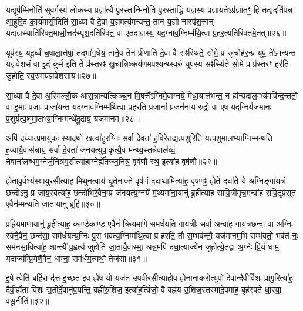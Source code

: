 यद्यूप॑म्मि॒नोति॑ सुव॒र्गस्य॑ लो॒कस्य॒ प्रज्ञा᳚त्यै पु॒रस्ता᳚न्मिनोति पु॒रस्ता॒द्धि य॒ज्ञस्य॑ प्रज्ञा॒यते\-ऽप्र॑ज्ञात॒ꣳ॒ हि तद्यदति॑पन्न आ॒हुरि॒दं का॒र्य॑मासी॒दिति॑ सा॒ध्या वै दे॒वा य॒ज्ञमत्य॑मन्यन्त॒ तान् य॒ज्ञो नास्पृ॑श॒त्तान् यद्य॒ज्ञस्याति॑रिक्त॒मासी॒त्तद॑स्पृश॒\-दति॑रिक्तं॒ वा ए॒तद्य॒ज्ञस्य॒ यद॒ग्नाव॒ग्निम्म॑थि॒त्वा प्र॒हर॒त्यति॑रिक्तमे॒तत्॥२६॥

यूप॑स्य॒ यदू॒र्ध्वं च॒षाला॒त्तेषां॒ तद्भा॑ग॒धेयं॒ ताने॒व तेन॑ प्रीणाति दे॒वा वै सꣴस्थि॑ते॒ सोमे॒ प्र स्रुचोह॑र॒न्प्र यूपं॒ ते॑\-ऽमन्यन्त यज्ञवेश॒सं वा इ॒दं कु॑र्म॒ इति॒ ते प्र॑स्त॒रꣴ स्रु॒चान्नि॒ष्क्रय॑णमपश्य॒न्थ्स्वरुं॒ यूप॑स्य॒ सꣴस्थि॑ते॒ सोमे॒ प्र प्र॑स्त॒रꣳ हर॑ति जु॒होति॒ स्व॒रुमय॑ज्ञवेशसाय॥२७॥

{}

सा॒ध्या वै दे॒वा अ॒स्मिल्लोँ॒क आ॑स॒न्नान्यत्किञ्च॒न मि॒षत्ते᳚\-ऽग्निमे॒वाग्नये॒ मेधा॒याल॑भन्त॒ न ह्य॑न्यदा॑ल॒म्भ्य॑मवि॑न्द॒न्ततो॒ वा इ॒माः प्र॒जाः प्राजा॑यन्त॒ यद॒ग्नाव॒ग्निम्म॑थि॒त्वा प्र॒हर॑ति प्र॒जानां᳚ प्र॒जन॑नाय रु॒द्रो वा ए॒ष यद॒ग्निर्यज॑मानः प॒शुर्यत्प॒शुमा॒लभ्या॒ग्निम्मन्थे᳚द्रु॒द्राय॒ यज॑मानम्॥२८॥

अपि॑ दध्यात्प्र॒मायु॑कः स्या॒दथो॒ खल्वा॑हुर॒ग्निः सर्वा॑ दे॒वता॑ ह॒विरे॒तद्यत्प॒शुरिति॒ यत्प॒शुमा॒लभ्या॒ग्निम्मन्थ॑ति ह॒व्यायै॒वास॑न्नाय॒ सर्वा॑ दे॒वता॑ जनयत्युपा॒कृत्यै॒व मन्थ्य॒स्तन्नेवाल॑ब्धं॒ नेवाना॑लब्धम॒ग्नेर्ज॒नित्र॑म॒सीत्या॑हा॒ग्नेर्\mbox{}ह्ये॑तज्ज॒नित्रं॒ वृष॑णौ स्थ॒ इत्या॑ह॒ वृष॑णौ॥२९॥

ह्ये॑तावु॒र्वश्य॑स्या॒युर॒सीत्या॑ह मिथुन॒त्वाय॑ घृ॒तेना॒क्ते वृष॑णं दधाथा॒मित्या॑ह॒ वृष॑ण॒ꣴ॒ ह्ये॑ते दधा॑ते॒ ये अ॒ग्निङ्गा॑य॒त्रं छन्दो\-ऽनु॒ प्र जा॑य॒स्वेत्या॑ह॒ छन्दो॑भिरे॒वैन॒म्प्र ज॑नयत्य॒ग्नये॑ म॒थ्यमा॑ना॒यानु॑ ब्रू॒हीत्या॑ह सावि॒त्रीमृच॒मन्वा॑ह सवि॒तृप्र॑सूत ए॒वैन॑म्मन्थति जा॒ताया॑नु ब्रूहि॥३०॥

प्र॒ह्रि॒यमा॑णा॒यानु॑ ब्रू॒हीत्या॑ह॒ काण्डे॑काण्ड ए॒वैनं॑ क्रियमा॑णे॒ सम॑र्धयति गाय॒त्रीः सर्वा॒ अन्वा॑ह गाय॒त्रछ॑न्दा॒ वा अ॒ग्निः स्वेनै॒वैनं॒ छन्द॑सा॒ सम॑र्धयत्य॒ग्निः पु॒रा भव॑त्य॒ग्निम्म॑थि॒त्वा प्र ह॑रति॒ तौ स॒म्भव॑न्तौ॒ यज॑मानम॒भि सम्भ॑वतो॒ भव॑तं नः॒ सम॑नसा॒वित्या॑ह॒ शान्त्यै᳚ प्र॒हृत्य॑ जुहोति जा॒तायै॒वास्मा॒ अन्न॒मपि॑ दधा॒त्याज्ये॑न जुहोत्ये॒तद्वा अ॒ग्नेः प्रि॒यं धाम॒ यदाज्य॑म्प्रि॒येणै॒वैनं॒ धाम्ना॒ सम॑र्धय॒त्यथो॒ तेज॑सा॥३१॥

{\anuvakamend[{यज॑मानमाह॒ वृष॑णौ जाता॒यानु॑ब्रू॒ह्यप्य॒ष्टाद॑श च॥५॥}]}

इ॒षे त्वेति॑ ब॒र्\mbox{}हिरा द॑त्त इ॒च्छत॑ इव॒ ह्ये॑ष यो यज॑त उप॒वीर॒सीत्या॒होप॒ ह्ये॑नानाक॒रोत्युपो॑ दे॒वान्दैवी॒र्विशः॒ प्रागु॒रित्या॑ह॒ दैवी॒र्\mbox{}ह्ये॑ता विशः॑ स॒तीर्दे॒वानु॑प॒यन्ति॒ वह्नी॑रु॒शिज॒ इत्या॑ह॒र्त्विजो॒ वै वह्न॑य उ॒शिज॒स्तस्मा॑दे॒वमा॑ह॒ बृह॑स्पते धा॒रया॒ वसू॒नीति॑॥३२॥

